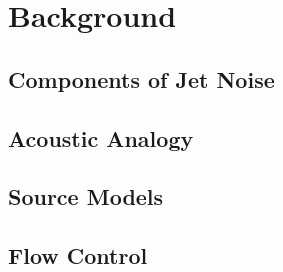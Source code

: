 \chapter{Background}
\label{background}
\section{Components of Jet Noise}

\section{Acoustic Analogy}

\section{Source Models}

\section{Flow Control}